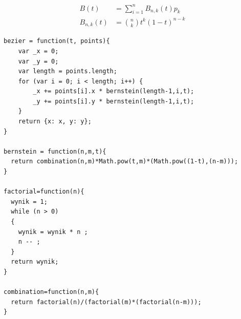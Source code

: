 \begin{eqnarray}
B(t) &= \sum\limits_{i=1}^n B_{n,k} (t) p_{k} \\
B_{n,k}(t) &=\binom{n}{k} t^k(1-t)^{n-k}
\end{eqnarray}


\lstset{language=JavaScript}
\begin{lstlisting}[label={lst:aproks},caption={Aproksymacja danych}]
bezier = function(t, points){
	var _x = 0;
	var _y = 0;
	var length = points.length;
	for (var i = 0; i < length; i++) {
		_x += points[i].x * bernstein(length-1,i,t);
		_y += points[i].y * bernstein(length-1,i,t);
	}
	return {x: x, y: y};
}

bernstein = function(n,m,t){
  return combination(n,m)*Math.pow(t,m)*(Math.pow((1-t),(n-m)));
}

factorial=function(n){
  wynik = 1;
  while (n > 0)
  {
    wynik = wynik * n ;
    n -- ;
  }
  return wynik;
}

combination=function(n,m){
  return factorial(n)/(factorial(m)*(factorial(n-m)));
}

\end{lstlisting}
